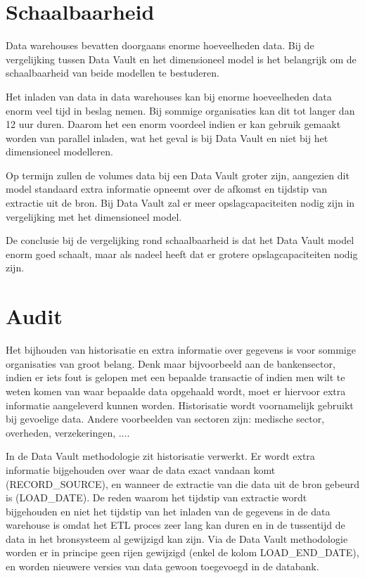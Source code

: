 \section{Schaalbaarheid}
Data warehouses bevatten doorgaans enorme hoeveelheden data. Bij de vergelijking tussen Data Vault en het dimensioneel model is het belangrijk om de schaalbaarheid van beide modellen te bestuderen. 

Het inladen van data in data warehouses kan bij enorme hoeveelheden data enorm veel tijd in beslag nemen. Bij sommige organisaties kan dit tot langer dan 12 uur duren. Daarom het een enorm voordeel indien er kan gebruik gemaakt worden van parallel inladen, wat het geval is bij Data Vault en niet bij het dimensioneel modelleren.

Op termijn zullen de volumes data bij een Data Vault groter zijn, aangezien dit model standaard extra informatie opneemt over de afkomst en tijdstip van extractie uit de bron. Bij Data Vault zal er meer opslagcapaciteiten nodig zijn in vergelijking met het dimensioneel model.

De conclusie bij de vergelijking rond schaalbaarheid is dat het Data Vault model enorm goed schaalt, maar als nadeel heeft dat er grotere opslagcapaciteiten nodig zijn.

\section{Audit}
Het bijhouden van historisatie en extra informatie over gegevens is voor sommige organisaties van groot belang. Denk maar bijvoorbeeld aan de bankensector, indien er iets fout is gelopen met een bepaalde transactie of indien men wilt te weten komen van waar bepaalde data opgehaald wordt, moet er hiervoor extra informatie aangeleverd kunnen worden. Historisatie wordt voornamelijk gebruikt bij gevoelige data. Andere voorbeelden van sectoren zijn: medische sector, overheden, verzekeringen, ....

In de Data Vault methodologie zit historisatie verwerkt. Er wordt extra informatie bijgehouden over waar de data exact vandaan komt (RECORD\_SOURCE), en wanneer de extractie van die data uit de bron gebeurd is (LOAD\_DATE). De reden waarom het tijdstip van extractie wordt bijgehouden en niet het tijdstip van het inladen van de gegevens in de data warehouse is omdat het ETL proces zeer lang kan duren en in de tussentijd de data in het bronsysteem al gewijzigd kan zijn. Via de Data Vault methodologie worden er in principe geen rijen gewijzigd (enkel de kolom LOAD\_END\_DATE), en worden nieuwere versies van data gewoon toegevoegd in de databank.

